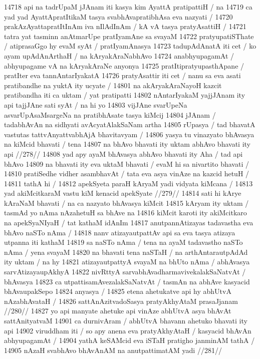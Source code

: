 14718 api na tadrUpaM jJAnam iti kasya kim AyattA pratipattiH / na
14719 ca yad yad AyattApratItikaM tasya svabhAvapratibhAsa eva nazyati / 
14720 prakAzAyattapratItInAm iva nIlAdInAm / kA vA tasya pratyAsattiH /
14721 tatra yat tasminn anAtmarUpe pratIyamAne sa svayaM 
14722 pratyupatiSThate / atiprasaGgo hy evaM syAt / pratIyamAnasya  
14723 tadupAdAnatA iti cet / ko ayam upAdAnArthaH / na kAryakAraNabhAvo
14724 anabhyupagamAt / abhyupagame vA na kAryakAraNe anyonya  
14725 pratItipratyupasthApane / pratIter eva tannAntarIyakatA  
14726 pratyAsattir iti cet / nanu sa eva asati pratibandhe na yuktA ity ucyate /
14801 na akAryakAraNayoH kazcit pratibandha iti ca uktam / yat pratipatti  
14802 nAntarIyakaM yajjJAnam ity api tajjJAne sati syAt /  na hi yo
14803 vijJAne svarUpeNa asvarUpAsaMsargeNa na pratibhAsate tasya kiMcij
14804 jJAnam / tadabhAvAn na sidhyati avAcyatAlakSaNam artha
14805 rUpasya / tad bhavatA vastutas tattvAnyattvabhAjA bhavitavyam /  
14806 yasya tu vinazyato bhAvasya na kiMcid bhavati / tena  
14807 	na bhAvo bhavati ity uktam abhAvo bhavati ity api //278// 
14808 yad apy ayaM bhAvasya abhAvo bhavati ity Aha / tad api bhAvo 
14809 na bhavati ity eva uktaM bhavati / evaM hi sa nivartito bhavati /
14810 pratiSedhe vidher asambhavAt / tata eva asya vinAze na kazcid hetuH /
14811 tathA hi /
14812 	apekSyeta paraH kAryaM yadi vidyata kiMcana /  
14813 	yad akiMcitkaraM vastu kiM kenacid apekSyate //279//  
14814 sati hi kArye kAraNaM bhavati / na ca nazyato bhAvasya kiMcit 
14815 kAryam ity uktam / tasmAd yo nAma nAzahetuH sa bhAve na 
14816 kiMcit karoti ity akiMcitkaro na apekSyaNIyaH / tat kathaM idAnIm
14817 anutpannAtizayas tadavastha eva bhAvo naSTo nAma / 
14818 nanv atizayautpattAv api sa eva tasya atizaya utpanna iti kathaM  
14819 sa naSTo nAma / tena na ayaM tadavastho naSTo nAma / yena svayaM 
14820 na bhavati tena naSTaH / na arthAntarautpAdAd ity uktam / na hy
14821 atizayautpattyA svayaM na bhUto nAma / abhAvasya sarvAtizayaupAkhyA
14822 nivRttyA sarvabhAvadharmavivekalakSaNatvAt / bhAvasya 
14823 ca utpattisamAvezalakSaNatvAt / tasmAn na abhAve kasyacid bhAvaupakSepo
14824 anyasya /  
14825 	etena ahetukatve api hy abhUtvA nAzabhAvataH /
14826 	sattAnAzitvadoSasya pratyAkhyAtaM prasaJjanam //280// 
14827 yo api manyate ahetuke api vinAze abhUtvA asya bhAvAt sattAnityatvaM 
14901 ca durnivAram / abhUtvA bhavann ahetuko bhavati ity api 
14902 viruddham iti / so apy anena eva pratyAkhyAtaH / kasyacid bhAvAn abhyupagamAt /
14904 	yathA keSAMcid eva iSTaH pratigho janminAM tathA /
14905 	nAzaH svabhAvo bhAvAnAM na anutpattimatAM yadi //281//
